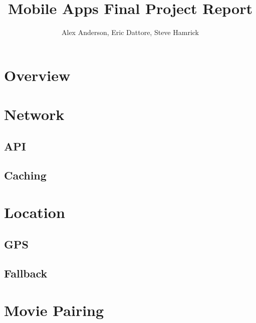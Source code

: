 \documentclass{article}
\title{Mobile Apps Final Project Report}
\author{Alex Anderson, Eric Dattore, Steve Hamrick}
\date{}
\begin{document}
    \maketitle
    \section*{Overview}
    \section*{Network}
    \subsection*{API}
    \subsection*{Caching}
    \section*{Location}
    \subsection*{GPS}
    \subsection*{Fallback}
    \section*{Movie Pairing}
\end{document}
